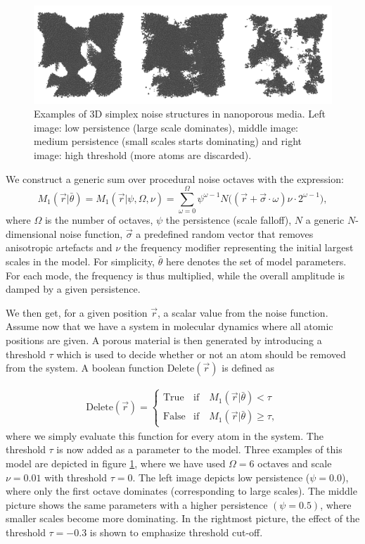 \documentclass[aps,pre,twocolumn,letterpaper,floatfix,showpacs]{revtex4}
\begin{document}
\begin{figure}
\includegraphics[width=.95\textwidth]{model_examples.png}
\caption{Examples of 3D simplex noise structures in nanoporous media. Left image:
low persistence (large scale dominates), middle image: medium persistence (small
scales starts dominating) and right image: high threshold (more atoms are discarded). }
\label{fig:model_example}
\end{figure}
We construct a generic sum over procedural noise octaves with the expression: 
\begin{equation}
  M_1(\vec r |\bar \theta) = M_1(\vec r | \psi, \Omega, \nu) = \sum_{\omega=0}^{\Omega} \psi^{\omega -1}   N\big((\vec r + \vec\sigma \cdot \omega)\nu \cdot 2^{\omega-1} \big),
\label{eq:noisemodel1}
\end{equation}
where $\Omega$ is the number of octaves, $\psi$ the persistence (scale falloff),
$N$ a generic $N$-dimensional noise function, $\vec \sigma$ a predefined random
vector that removes anisotropic artefacts and $\nu$ the frequency modifier representing
the initial largest scales in the model. For simplicity, $\bar \theta$ here denotes
the set of model parameters. For each mode, the frequency is thus multiplied, while
the overall amplitude is damped by a given persistence.

We then get, for a given position $\vec r$, a scalar value from the noise function.
Assume now that we have a system in molecular dynamics where all atomic positions are given.
A porous material is then generated by introducing a threshold $\tau$ which is used to decide whether or not an atom should be removed from the system.
A boolean function $\text{Delete}(\vec r)$ is defined as

\begin{align}
  \text{Delete}(\vec r) = 
  \begin{cases} 
    \text{True} & \text{if} \quad M_1(\vec r |\bar \theta) < \tau \\
    \text{False} & \text{if} \quad M_1(\vec r |\bar \theta) \geq \tau,
  \end{cases}
\end{align}
where we simply evaluate this function for every atom in the system.
The threshold $\tau$ is now added as a parameter to the model.
Three examples of this model are depicted in figure \ref{fig:model_example}, where we have
used $\Omega=6$ octaves and scale $\nu=0.01$ with threshold $\tau=0$. The left
image depicts low persistence ($\psi = 0.0$), where only the first octave dominates
(corresponding to large scales). The middle picture shows the same parameters with
a higher persistence $(\psi = 0.5)$, where smaller scales become more dominating.
In the rightmost picture, the effect of the threshold $\tau = -0.3$ is shown to emphasize threshold cut-off.
\end{document}
